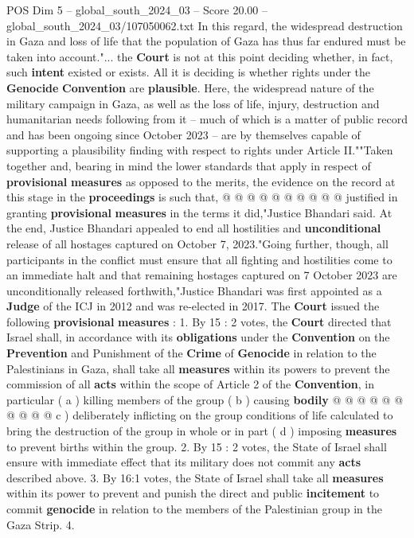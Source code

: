 \begin{textsample}{POS Dim 5 – global\_south\_2024\_03 – Score 20.00 – global\_south\_2024\_03/107050062.txt}
In this regard, the widespread destruction in Gaza and loss of life that the population of Gaza has thus far endured must be taken into account."... the \textbf{Court} is not at this point deciding whether, in fact, such \textbf{intent} existed or exists.
All it is deciding is whether rights under the \textbf{Genocide} \textbf{Convention} are \textbf{plausible}.
Here, the widespread nature of the military campaign in Gaza, as well as the loss of life, injury, destruction and humanitarian needs following from it -- much of which is a matter of public record and has been ongoing since October 2023 -- are by themselves capable of supporting a plausibility finding with respect to rights under Article II.""Taken together and, bearing in mind the lower standards that apply in respect of \textbf{provisional} \textbf{measures} as opposed to the merits, the evidence on the record at this stage in the \textbf{proceedings} is such that, @ @ @ @ @ @ @ @ @ @ justified in granting \textbf{provisional} \textbf{measures} in the terms it did,"Justice Bhandari said.
At the end, Justice Bhandari appealed to end all hostilities and \textbf{unconditional} release of all hostages captured on October 7, 2023."Going further, though, all participants in the conflict must ensure that all fighting and hostilities come to an immediate halt and that remaining hostages captured on 7 October 2023 are unconditionally released forthwith,"Justice Bhandari was first appointed as a \textbf{Judge} of the ICJ in 2012 and was re-elected in 2017.
The \textbf{Court} issued the following \textbf{provisional} \textbf{measures} : 1.
By 15 : 2 votes, the \textbf{Court} directed that Israel shall, in accordance with its \textbf{obligations} under the \textbf{Convention} on the \textbf{Prevention} and Punishment of the \textbf{Crime} of \textbf{Genocide} in relation to the Palestinians in Gaza, shall take all \textbf{measures} within its powers to prevent the commission of all \textbf{acts} within the scope of Article 2 of the \textbf{Convention}, in particular ( a ) killing members of the group ( b ) causing \textbf{bodily} @ @ @ @ @ @ @ @ @ @ c ) deliberately inflicting on the group conditions of life calculated to bring the destruction of the group in whole or in part ( d ) imposing \textbf{measures} to prevent births within the group. 2.
By 15 : 2 votes, the State of Israel shall ensure with immediate effect that its military does not commit any \textbf{acts} described above. 3.
By 16:1 votes, the State of Israel shall take all \textbf{measures} within its power to prevent and punish the direct and public \textbf{incitement} to commit \textbf{genocide} in relation to the members of the Palestinian group in the Gaza Strip. 4.

\end{textsample}
